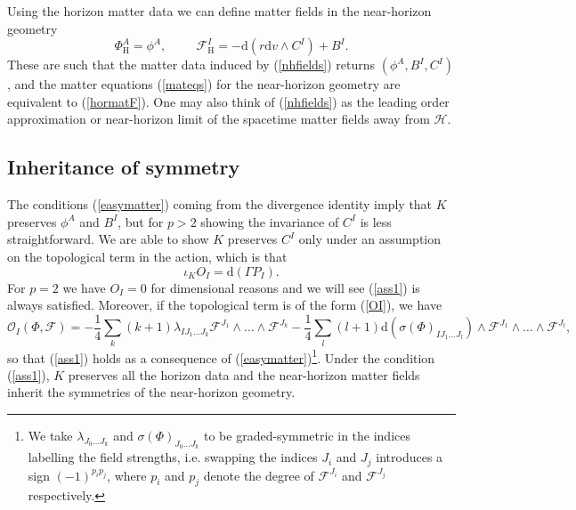 \documentclass[11pt, reqno]{amsart}
\theoremstyle{plain}
\theoremstyle{definition}
\numberwithin{equation}{section}
\begin{document}
Using the horizon matter data we can define matter fields in the near-horizon geometry
\begin{equation} \label{nhfields}
    \Phi^A_{\text{H}} = \phi^A, \hspace{1cm} \mathcal{F}^I_{\text{H}} = -\text{d}(r\text{d}v \wedge C^I) + B^I.
\end{equation}
These are such that the matter data induced by (\ref{nhfields}) returns $(\phi^A,B^I, C^I)$, and the matter equations (\ref{mateqs}) for the near-horizon geometry are equivalent to (\ref{hormatF}). One may also think of (\ref{nhfields}) as the leading order approximation or near-horizon limit of the spacetime matter fields  away from $\mathcal{H}$.
\subsection{Inheritance of symmetry} \label{secinh1}
The conditions (\ref{easymatter}) coming from the divergence identity imply that $K$ preserves $\phi^A$ and $B^I$, but for $p > 2$ showing the invariance of $C^I$ is less straightforward. We are able to show $K$ preserves $C^I$ only under an assumption on the topological term in the action, which is that 
\begin{equation} \label{ass1}
    \iota_K O_I = \text{d}(\Gamma P_I).
\end{equation}
For $p=2$ we have $O_I = 0$ for dimensional reasons and we will see (\ref{ass1}) is always satisfied. Moreover, if the topological term is of the form (\ref{OI}), we have 
\begin{equation} \label{OI2}
    \mathcal{O}_I(\Phi, \mathcal{F}) = -\frac 14\sum_k (k+1)\lambda_{IJ_1\dots J_{k}}\mathcal{F}^{J_1}\wedge \dots \wedge \mathcal{F}^{J_k} -\frac{1}{4} \sum_l(l+1)\text{d}(\sigma(\Phi)_{IJ_1\dots J_l}) \wedge \mathcal{F}^{J_1}\wedge \dots\wedge \mathcal{F}^{J_l},
\end{equation}
so that (\ref{ass1}) holds as a consequence of (\ref{easymatter})\footnote{We take $\lambda_{J_0\dots J_k}$ and $\sigma(\Phi)_{J_0\dots J_k}$ to be graded-symmetric in the indices labelling the field strengths, i.e. swapping the indices $J_i$ and $J_j$ introduces a sign $(-1)^{p_ip_j}$, where $p_i$ and $p_j$ denote the degree of $\mathcal{F}^{J_i}$ and $\mathcal{F}^{J_j}$ respectively.}.  Under the condition (\ref{ass1}), $K$ preserves all the horizon data and the near-horizon matter fields inherit the symmetries of the near-horizon geometry.
\end{document}
